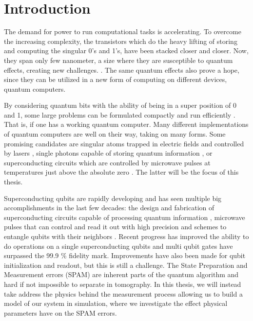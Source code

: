 \chapter{Introduction}\label{chap:Introduction}
The demand for power to run computational tasks is accelerating. To overcome the increasing complexity, the transistors which do the heavy lifting of storing and computing the singular 0's and 1's, have been stacked closer and closer. Now, they span only few nanometer, a size where they are susceptible to quantum effects, creating new challenges. \cite{morton_embracing_2011}. The same quantum effects also prove a hope, since they can be utilized in a new form of computing on different devices, quantum computers. 

By considering quantum bits with the ability of being in a super position of 0 and 1, some large problems can be formulated compactly and run efficiently \cite{preskill_quantum_2018}. That is, if one has a working quantum computer. Many different implementations of quantum computers are well on their way, taking on many forms. Some promising candidates are  singular atoms trapped in electric fields and controlled by lasers \cite{brown_co-designing_2016}, single photons capable of storing quantum information \cite{obrien_optical_2007}, or superconducting circuits which are controlled by microwave pulses at temperatures just above the absolute zero \cite{krantz_quantum_2019}. The latter will be the focus of this thesis. 

Superconducting qubits are rapidly developing and has seen multiple big accomplishments in the last few decades: the design and fabrication of superconducting circuits capable of processing quantum information \cite{koch_charge_2007, manucharyan_fluxonium_2009}, microwave pulses that can control and read it out with high precision \cite{motzoi_simple_2009, walter_rapid_2017} and schemes to entangle qubits with their neighbors \cite{yan_tunable_2018}. Recent progress has improved the ability to do operations on a single superconducting qubits \cite{barends_superconducting_2014} and multi qubit gates have surpassed the 99.9 \% fidelity mark\cite{ding_high-fidelity_2023}. Improvements have also been made for qubit initialization and readout\cite{walter_rapid_2017, swiadek_enhancing_2023}, but this is still a challenge. The State Preparation and Measurement errors (SPAM) are inherent parts of the quantum algorithm and hard if not impossible to separate in tomography\cite{lin_independent_2021}. In this thesis, we will instead take address the physics behind the measurement process allowing us to build a model of our system in simulation, where we investigate the effect physical parameters have on the SPAM errors. 


